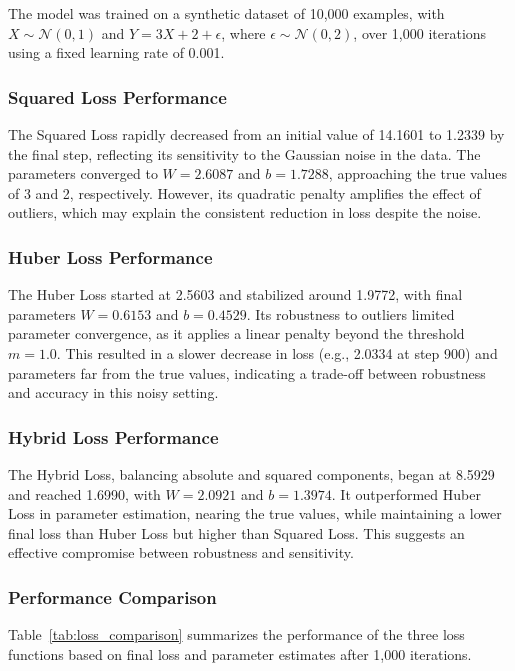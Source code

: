 \documentclass{article}
\begin{document}
The model was trained on a synthetic dataset of 10,000 examples, with \( X \sim \mathcal{N}(0, 1) \) and \( Y = 3X + 2 + \epsilon \), where \( \epsilon \sim \mathcal{N}(0, 2) \), over 1,000 iterations using a fixed learning rate of 0.001.

\subsubsection{Squared Loss Performance}

The Squared Loss rapidly decreased from an initial value of 14.1601 to 1.2339 by the final step, reflecting its sensitivity to the Gaussian noise in the data. The parameters converged to \( W = 2.6087 \) and \( b = 1.7288 \), approaching the true values of 3 and 2, respectively. However, its quadratic penalty amplifies the effect of outliers, which may explain the consistent reduction in loss despite the noise.

\subsubsection{Huber Loss Performance}

The Huber Loss started at 2.5603 and stabilized around 1.9772, with final parameters \( W = 0.6153 \) and \( b = 0.4529 \). Its robustness to outliers limited parameter convergence, as it applies a linear penalty beyond the threshold \( m = 1.0 \). This resulted in a slower decrease in loss (e.g., 2.0334 at step 900) and parameters far from the true values, indicating a trade-off between robustness and accuracy in this noisy setting.

\subsubsection{Hybrid Loss Performance}

The Hybrid Loss, balancing absolute and squared components, began at 8.5929 and reached 1.6990, with \( W = 2.0921 \) and \( b = 1.3974 \). It outperformed Huber Loss in parameter estimation, nearing the true values, while maintaining a lower final loss than Huber Loss but higher than Squared Loss. This suggests an effective compromise between robustness and sensitivity.

\subsubsection{Performance Comparison}

Table~\ref{tab:loss_comparison} summarizes the performance of the three loss functions based on final loss and parameter estimates after 1,000 iterations.
\end{document}

